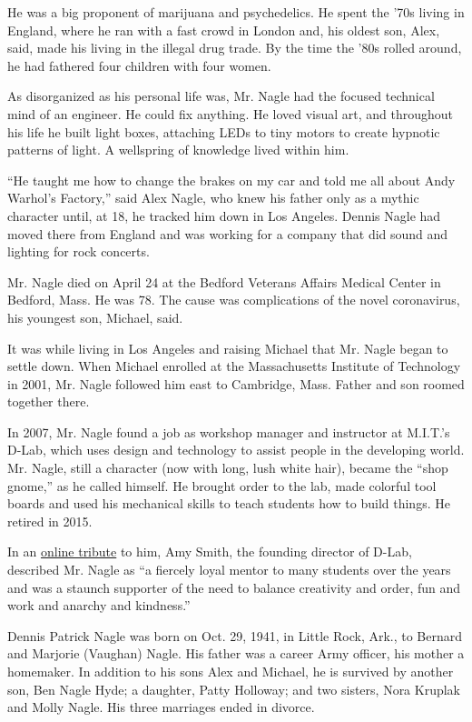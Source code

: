 He was a big proponent of marijuana and psychedelics. He spent the '70s
living in England, where he ran with a fast crowd in London and, his
oldest son, Alex, said, made his living in the illegal drug trade. By
the time the '80s rolled around, he had fathered four children with four
women.

As disorganized as his personal life was, Mr. Nagle had the focused
technical mind of an engineer. He could fix anything. He loved visual
art, and throughout his life he built light boxes, attaching LEDs to
tiny motors to create hypnotic patterns of light. A wellspring of
knowledge lived within him.

``He taught me how to change the brakes on my car and told me all about
Andy Warhol's Factory,'' said Alex Nagle, who knew his father only as a
mythic character until, at 18, he tracked him down in Los Angeles.
Dennis Nagle had moved there from England and was working for a company
that did sound and lighting for rock concerts.

Mr. Nagle died on April 24 at the Bedford Veterans Affairs Medical
Center in Bedford, Mass. He was 78. The cause was complications of the
novel coronavirus, his youngest son, Michael, said.

It was while living in Los Angeles and raising Michael that Mr. Nagle
began to settle down. When Michael enrolled at the Massachusetts
Institute of Technology in 2001, Mr. Nagle followed him east to
Cambridge, Mass. Father and son roomed together there.

In 2007, Mr. Nagle found a job as workshop manager and instructor at
M.I.T.'s D-Lab, which uses design and technology to assist people in the
developing world. Mr. Nagle, still a character (now with long, lush
white hair), became the ``shop gnome,'' as he called himself. He brought
order to the lab, made colorful tool boards and used his mechanical
skills to teach students how to build things. He retired in 2015.

In an
\href{https://d-lab.mit.edu/news-blog/blog/remembering-d-lab-workshop-manager-and-instructor-dennis-nagle-1941-2020}{online
tribute} to him, Amy Smith, the founding director of D-Lab, described
Mr. Nagle as ``a fiercely loyal mentor to many students over the years
and was a staunch supporter of the need to balance creativity and order,
fun and work and anarchy and kindness.''

Dennis Patrick Nagle was born on Oct. 29, 1941, in Little Rock, Ark., to
Bernard and Marjorie (Vaughan) Nagle. His father was a career Army
officer, his mother a homemaker. In addition to his sons Alex and
Michael, he is survived by another son, Ben Nagle Hyde; a daughter,
Patty Holloway; and two sisters, Nora Kruplak and Molly Nagle. His three
marriages ended in divorce.

